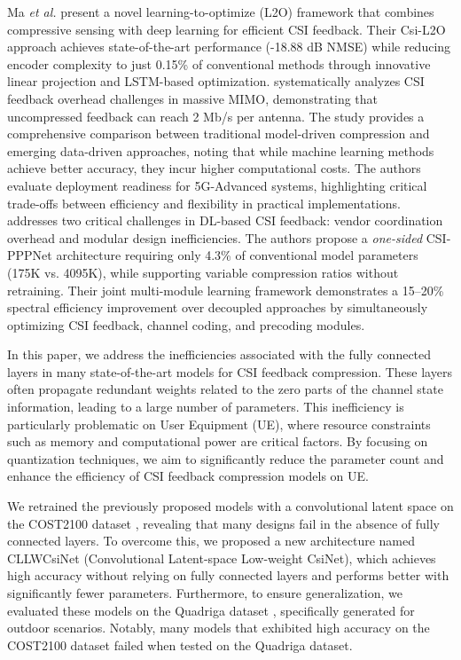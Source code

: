 \documentclass[lettersize,journal]{IEEEtran}
\begin{document}
Ma \textit{et al.} \cite{Ma2024} present a novel learning-to-optimize (L2O) framework that combines compressive sensing with deep learning for efficient CSI feedback. Their Csi-L2O approach achieves state-of-the-art performance (-18.88 dB NMSE) while reducing encoder complexity to just 0.15\% of conventional methods through innovative linear projection and LSTM-based optimization.
\cite{CSICompression2024} systematically analyzes CSI feedback overhead challenges in massive MIMO, demonstrating that uncompressed feedback can reach 2 Mb/s per antenna. The study provides a comprehensive comparison between traditional model-driven compression and emerging data-driven approaches, noting that while machine learning methods achieve better accuracy, they incur higher computational costs. The authors evaluate deployment readiness for 5G-Advanced systems, highlighting critical trade-offs between efficiency and flexibility in practical implementations.
\cite{Guo2024} addresses two critical challenges in DL-based CSI feedback: vendor coordination overhead and modular design inefficiencies. The authors propose a \textit{one-sided} CSI-PPPNet architecture requiring only 4.3\% of conventional model parameters (175K vs. 4095K), while supporting variable compression ratios without retraining. Their joint multi-module learning framework demonstrates a 15--20\% spectral efficiency improvement over decoupled approaches by simultaneously optimizing CSI feedback, channel coding, and precoding modules.




In this paper, we address the inefficiencies associated with the fully connected layers in many state-of-the-art models for CSI feedback compression. These layers often propagate redundant weights related to the zero parts of the channel state information, leading to a large number of parameters. This inefficiency is particularly problematic on User Equipment (UE), where resource constraints such as memory and computational power are critical factors. By focusing on quantization techniques, we aim to significantly reduce the parameter count and enhance the efficiency of CSI feedback compression models on UE.

We retrained the previously proposed models with a convolutional latent space on the COST2100 dataset \cite{abf}, revealing that many designs fail in the absence of fully connected layers. To overcome this, we proposed a new architecture named CLLWCsiNet (Convolutional Latent-space Low-weight CsiNet), which achieves high accuracy without relying on fully connected layers and performs better with significantly fewer parameters. Furthermore, to ensure generalization, we evaluated these models on the Quadriga dataset \cite{abt}, specifically generated for outdoor scenarios. Notably, many models that exhibited high accuracy on the COST2100 dataset \cite{abf} failed when tested on the Quadriga dataset\cite{abt}.
\end{document}
